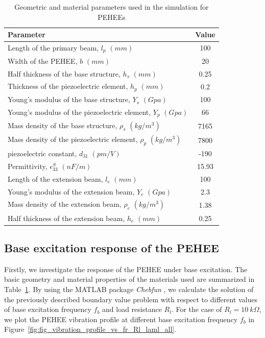\documentclass{elsarticle}
\begin{document}
\begin{table}[!htbp]
    \caption{Geometric and material parameters used in the simulation for PEHEEs}
    \label{tab:parameter_value_extension}
    \centering
    \begin{tabular}{lc}
    \hline
    \hline
    \textbf{Parameter} & \textbf{Value} \\
    \hline
       Length of the primary beam, $l_p$ $(mm)$  & 100 \\
       Width of the PEHEE, $b$ $(mm)$  & 20 \\
       Half thickness of the base structure, $h_s$ $(mm)$  & 0.25 \\
       Thickness of the piezoelectric element, $h_p$ $(mm)$  & 0.2 \\
       Young's modulus of the base structure, $Y_s$ $(Gpa)$  & 100 \\
       Young's modulus of the piezoelectric element, $Y_p$ $(Gpa)$  & 66 \\
       Mass density of the base structure, $\rho_s$ $(kg/m^3)$  & 7165 \\
       Mass density of the piezoelectric element, $\rho_p$ $(kg/m^3)$  & 7800 \\
       piezoelectric constant, $d_{31}$ $(pm/V)$  & -190 \\
       Permittivity, $\epsilon^S_{33}$ $(nF/m)$  & 15.93 \\
       Length of the extension beam, $l_e$ $(mm)$  & 100 \\
       Young's modulus of the extension beam, $Y_e$ $(Gpa)$  & 2.3 \\
       Mass density of the extension beam, $\rho_e$ $(kg/m^3)$  & 1.38 \\
       Half thickness of the extension beam, $h_e$ $(mm)$  & 0.25 \\
    \hline
    \hline
    \end{tabular}
\end{table}

\subsection{Base excitation response of the PEHEE}

Firstly, we investigate the response of the PEHEE under base excitation. The basic geometry and material properties of the materials used are summarized in Table~\ref{tab:parameter_value_extension}. By using the MATLAB package \textit{Chebfun} \cite{driscoll2014chebfun}, we calculate the solution of the previously described boundary value problem with respect to different values of base excitation frequency $f_b$ and load resistance $R_l$. For the case of $R_l = 10\ k\Omega$, we plot the PEHEE vibration profile at different base excitation frequency $f_b$ in Figure~\ref{fig:fig_vibration_profile_vs_fr_Rl_laml_all}.
\end{document}
